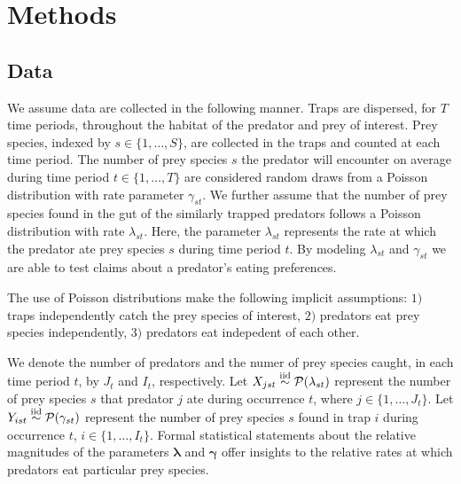 \section{Methods}
\label{sec:methods}

\subsection{Data}

We assume data are collected in the following manner.  Traps are dispersed, for $T$ time periods, throughout the habitat of the predator and prey of interest.  Prey species, indexed by $s \in \{1, \ldots, S \}$, are collected in the traps and counted at each time period.  The number of prey species $s$ the predator will encounter on average during time period $t \in \{1, \ldots, T\}$ are considered random draws from a Poisson distribution with rate parameter $\gamma_{st}$.  We further assume that the number of prey species found in the gut of the similarly trapped predators follows a Poisson distribution with rate $\lambda_{st}$.  Here, the parameter $\lambda_{st}$ represents the rate at which the predator ate prey species $s$ during time period $t$.  By modeling $\lambda_{st}$ and $\gamma_{st}$ we are able to test claims about a predator's eating preferences.  

The use of Poisson distributions make the following implicit assumptions: $1)$ traps independently catch the prey species of interest, $2)$ predators eat prey species independently, $3)$ predators eat indepedent of each other.

We denote the number of predators and the numer of prey species caught, in each time period $t$, by $J_t$ and $I_t$, respectively.  Let $X_{jst} \stackrel{\mathrm{iid}}{\sim} \mathcal{P}(\lambda_{st})$ represent the number of prey species $s$ that predator $j$ ate during occurrence $t$, where $j \in \{1, \ldots, J_t\}$.  Let $Y_{ist} \stackrel{\mathrm{iid}}{\sim} \mathcal{P}(\gamma_{st})$ represent the number of prey species $s$ found in trap $i$ during occurrence $t$, $i \in \{1, \ldots, I_t\}$.  Formal statistical statements about the relative magnitudes of the parameters $\boldsymbol{\lambda}$ and $\boldsymbol{\gamma}$ offer insights to the relative rates at which predators eat particular prey species.  


